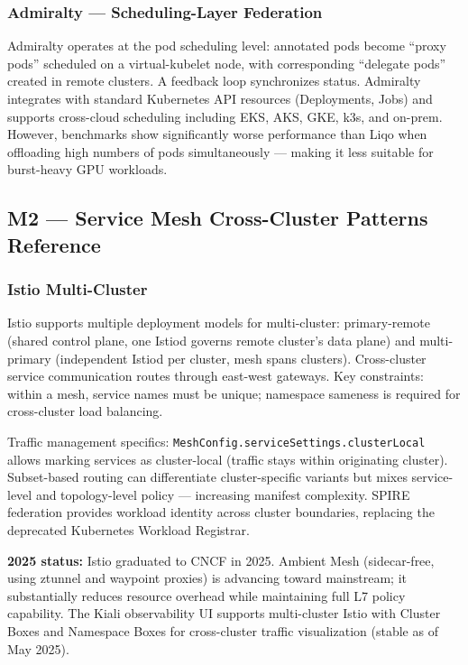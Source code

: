 \documentclass[11pt,letterpaper]{article}
\begin{document}
\subsubsection{Admiralty --- Scheduling-Layer Federation}

Admiralty operates at the pod scheduling level: annotated pods become ``proxy pods'' scheduled on a virtual-kubelet node, with corresponding ``delegate pods'' created in remote clusters. A feedback loop synchronizes status. Admiralty integrates with standard Kubernetes API resources (Deployments, Jobs) and supports cross-cloud scheduling including EKS, AKS, GKE, k3s, and on-prem. However, benchmarks show significantly worse performance than Liqo when offloading high numbers of pods simultaneously --- making it less suitable for burst-heavy GPU workloads.

\subsection{M2 --- Service Mesh Cross-Cluster Patterns Reference}

\subsubsection{Istio Multi-Cluster}

Istio supports multiple deployment models for multi-cluster: primary-remote (shared control plane, one Istiod governs remote cluster's data plane) and multi-primary (independent Istiod per cluster, mesh spans clusters). Cross-cluster service communication routes through east-west gateways. Key constraints: within a mesh, service names must be unique; namespace sameness is required for cross-cluster load balancing.

Traffic management specifics: \texttt{MeshConfig.serviceSettings.clusterLocal} allows marking services as cluster-local (traffic stays within originating cluster). Subset-based routing can differentiate cluster-specific variants but mixes service-level and topology-level policy --- increasing manifest complexity. SPIRE federation provides workload identity across cluster boundaries, replacing the deprecated Kubernetes Workload Registrar.

\textbf{2025 status:} Istio graduated to CNCF in 2025. Ambient Mesh (sidecar-free, using ztunnel and waypoint proxies) is advancing toward mainstream; it substantially reduces resource overhead while maintaining full L7 policy capability. The Kiali observability UI supports multi-cluster Istio with Cluster Boxes and Namespace Boxes for cross-cluster traffic visualization (stable as of May 2025).
\end{document}
